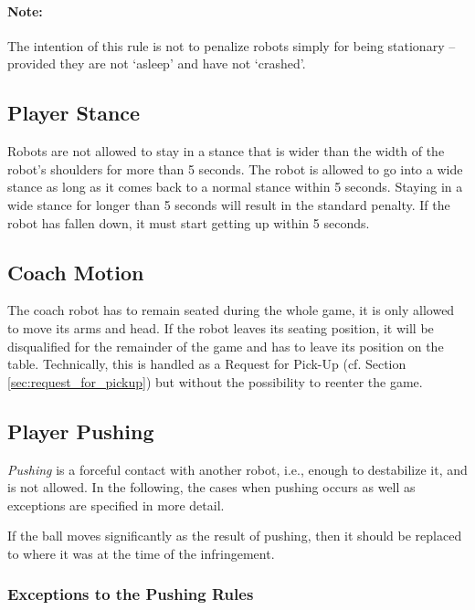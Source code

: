 \documentclass[12pt]{article}
\newcommand{\cf}{\mbox{cf.}\xspace}
\begin{document}
\paragraph{Note:} The intention of this rule is not to penalize robots simply for being stationary -- provided they are not `asleep' and have not `crashed'.

\subsection{Player Stance}
\label{sec:player_stance}

Robots are not allowed to stay in a stance that is wider than the width of the robot's shoulders for more than 5 seconds. The robot is allowed to go into a wide stance as long as it comes back to a normal stance within 5 seconds. Staying in a wide stance for longer than 5 seconds will result in the standard penalty. If the robot has fallen down, it must start getting up within 5 seconds. 

\subsection{Coach Motion}
\label{sec:coach_motion}

The coach robot has to remain seated during the whole game, it is only allowed to move its arms and head. If the robot leaves its seating position, it will be disqualified for the remainder of the game and has to leave its position on the table. Technically, this is handled as a Request for Pick-Up
(\cf Section \ref{sec:request_for_pickup}) but without the possibility to reenter the game.

\subsection{Player Pushing}
\label{sec:player_pushing}

\emph{Pushing} is a forceful contact with another robot, i.e., enough to destabilize it, and is not allowed. In the following, the cases when pushing occurs as well as exceptions are specified in more detail.

If the ball moves significantly as the result of pushing, then it should be replaced to where it was at the time of the infringement.

\subsubsection{Exceptions to the Pushing Rules}
\label{sec:situations_no_pushing}
\end{document}
